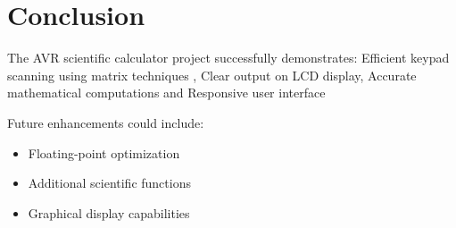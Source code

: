 \documentclass{article}
\begin{document}
\section{Conclusion}
The AVR scientific calculator project successfully demonstrates:
Efficient keypad scanning using matrix techniques
, Clear output on LCD display, Accurate mathematical computations
and  Responsive user interface

Future enhancements could include:
\begin{itemize}
\item Floating-point optimization
\item Additional scientific functions
\item Graphical display capabilities
\end{itemize}
\end{document}

